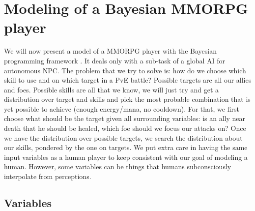 
\section{Modeling of a Bayesian MMORPG player}

We will now present a model of a MMORPG player with the Bayesian programming framework \citep{SYNNAEVE:MMORPG}. It deals only with a sub-task of a global AI for autonomous NPC. The problem that we try to solve is: how do we choose which skill to use and on which target in a PvE battle? Possible targets are all our allies and foes. Possible skills are all that we know, we will just try and get a distribution over target and skills and pick the most probable combination that is yet possible to achieve (enough energy/mana, no cooldown). For that, we first choose what should be the target given all surrounding variables: is an ally near death that he should be healed, which foe should we focus our attacks on? Once we have the distribution over possible targets, we search the distribution about our skills, pondered by the one on targets. We put extra care in having the same input variables as a human player to keep consistent with our goal of modeling a human. However, some variables can be things that humans subconsciously interpolate from perceptions.

\subsection{Variables}

